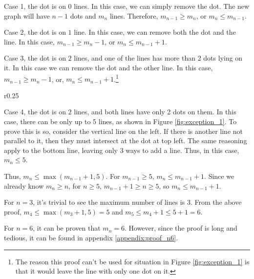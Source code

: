 \documentclass[a4paper, 12pt]{article}
\begin{document}
Case 1, the dot is on $0$ lines. In this case, we can simply remove the dot. The new graph will have $n-1$ dots and $m_n$ lines. Therefore, $m_{n-1}\geq m_{n}$, or $m_{n}\leq m_{n-1}$.

Case 2, the dot is on $1$ line. In this case, we can remove both the dot and the line. In this case, $m_{n-1}\geq m_{n}-1$, or $m_{n}\leq m_{n-1}+1$.

Case 3, the dot is on $2$ lines, and one of the lines has more than 2 dots lying on it. In this case we can remove the dot and the other line. In this case, $m_{n-1}\geq m_{n}-1$, or, $m_{n}\leq m_{n-1}+1$.\footnote{The reason this proof can't be used for situation in Figure \ref{fig:exception_1} is that it would leave the line with only one dot on it.}

\begin{wrapfigure}{r}{0.25\textwidth}
    \vspace{-0.5\baselineskip}
    
    \caption{3 potential lines when both line have only 2 dots}
    \label{fig:exception_1}
    \vspace{-1\baselineskip}
\end{wrapfigure}
 Case 4, the dot is on $2$ lines, and both lines have only 2 dots on them. In this case, there can be only up to 5 lines, as shown in Figure \ref{fig:exception_1}. To prove this is so, consider the vertical line on the left. If there is another line not parallel to it, then they must intersect at the dot at top left. The same reasoning apply to the bottom line, leaving only 3 ways to add a line. Thus, in this case, $m_{n}\leq{5}$.

Thus, $m_{n}\leq\max(m_{n-1}+1,5)$. For $m_{n-1}\geq5$, $m_n\leq m_{n-1}+1$.
Since we already know $m_n\geq n$, for $n\geq5$, $m_{n-1}+1\geq n\ge5$, so $m_n\leq m_{n-1}+1$.

For $n=3$, it's trivial to see the maximum number of lines is $3$. From the above proof, $m_4\leq\max(m_3+1,5)=5$ and $m_5\leq m_4+1\leq 5+1=6$.

For $n=6$, it can be proven that $m_n=6$. However, since the proof is long and tedious, it can be found in appendix \ref{appendix:proof_n6}.



\end{document}
